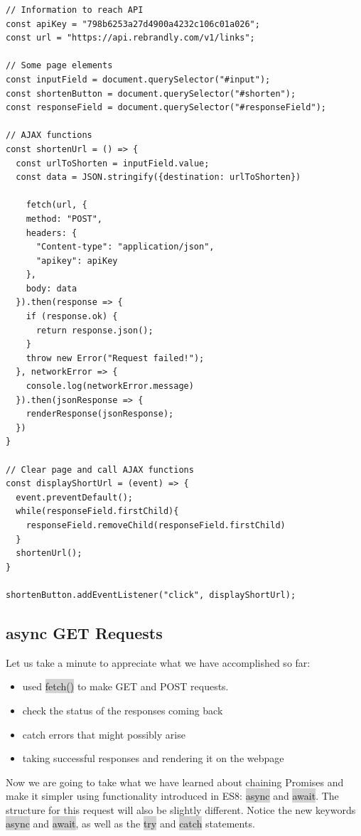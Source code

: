 \documentclass[11pt]{article}
\begin{document}
\begin{lstlisting}
// Information to reach API
const apiKey = "798b6253a27d4900a4232c106c01a026";
const url = "https://api.rebrandly.com/v1/links";

// Some page elements
const inputField = document.querySelector("#input");
const shortenButton = document.querySelector("#shorten");
const responseField = document.querySelector("#responseField");

// AJAX functions
const shortenUrl = () => {
  const urlToShorten = inputField.value;
  const data = JSON.stringify({destination: urlToShorten})
  
	fetch(url, {
    method: "POST",
    headers: {
      "Content-type": "application/json",
      "apikey": apiKey
    },
    body: data
  }).then(response => {
    if (response.ok) {
      return response.json();
    }
    throw new Error("Request failed!");
  }, networkError => {
    console.log(networkError.message)
  }).then(jsonResponse => {
    renderResponse(jsonResponse); 
  })
}

// Clear page and call AJAX functions
const displayShortUrl = (event) => {
  event.preventDefault();
  while(responseField.firstChild){
    responseField.removeChild(responseField.firstChild)
  }
  shortenUrl();
}

shortenButton.addEventListener("click", displayShortUrl);
\end{lstlisting}

\subsection{async GET Requests}
Let us take a minute to appreciate what we have accomplished so far:
\begin{itemize}[leftmargin = *]
\item used \colorbox{lightgray}{fetch()} to make GET and POST requests.
\item check the status of the responses coming back
\item catch errors that might possibly arise
\item taking successful responses and rendering it on the webpage
\end{itemize}

Now we are going to take what we have learned about chaining Promises and make it simpler using functionality introduced in ES8: \colorbox{lightgray}{async} and \colorbox{lightgray}{await}. The structure for this request will also be slightly different. Notice the new keywords \colorbox{lightgray}{async} and \colorbox{lightgray}{await}, as well as the \colorbox{lightgray}{try} and \colorbox{lightgray}{catch} statements.
\end{document}
